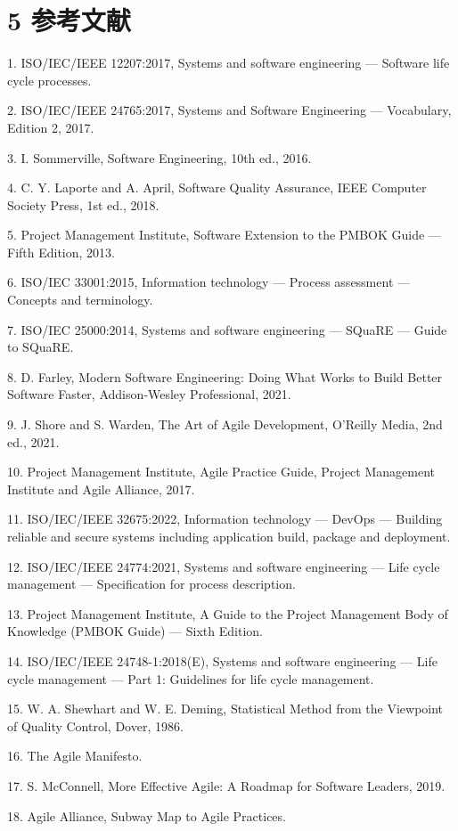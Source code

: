 \documentclass[uplatex,dvipdfmx,a4paper,11pt]{jsarticle}
\begin{document}
\section{5 参考文献}
1. ISO/IEC/IEEE 12207:2017, Systems and software engineering — Software life cycle processes.

2. ISO/IEC/IEEE 24765:2017, Systems and Software Engineering — Vocabulary, Edition 2, 2017.

3. I. Sommerville, Software Engineering, 10th ed., 2016.

4. C. Y. Laporte and A. April, Software Quality Assurance, IEEE Computer Society Press, 1st ed., 2018.

5. Project Management Institute, Software Extension to the PMBOK Guide — Fifth Edition, 2013.

6. ISO/IEC 33001:2015, Information technology — Process assessment — Concepts and terminology.

7. ISO/IEC 25000:2014, Systems and software engineering — SQuaRE — Guide to SQuaRE.

8. D. Farley, Modern Software Engineering: Doing What Works to Build Better Software Faster, Addison-Wesley Professional, 2021.

9. J. Shore and S. Warden, The Art of Agile Development, O’Reilly Media, 2nd ed., 2021.

10. Project Management Institute, Agile Practice Guide, Project Management Institute and Agile Alliance, 2017.

11. ISO/IEC/IEEE 32675:2022, Information technology — DevOps — Building reliable and secure systems including application build, package and deployment.

12. ISO/IEC/IEEE 24774:2021, Systems and software engineering — Life cycle management — Specification for process description.

13. Project Management Institute, A Guide to the Project Management Body of Knowledge (PMBOK Guide) — Sixth Edition.

14. ISO/IEC/IEEE 24748-1:2018(E), Systems and software engineering — Life cycle management — Part 1: Guidelines for life cycle management.

15. W. A. Shewhart and W. E. Deming, Statistical Method from the Viewpoint of Quality Control, Dover, 1986.

16. The Agile Manifesto.

17. S. McConnell, More Effective Agile: A Roadmap for Software Leaders, 2019.

18. Agile Alliance, Subway Map to Agile Practices.
\end{document}
